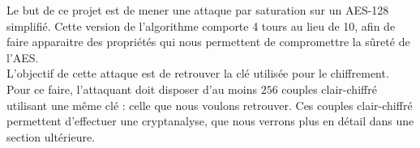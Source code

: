 \indent Le but de ce projet est de mener une attaque par saturation sur un AES-128 simplifié. Cette version de l'algorithme comporte 4 tours au lieu de 10, afin de faire apparaitre des propriétés qui nous permettent de compromettre la sûreté de l'AES. \\
\indent L'objectif de cette attaque est de retrouver la clé utilisée pour le chiffrement. Pour ce faire, l'attaquant doit disposer d'au moins $256$ couples clair-chiffré utilisant une même clé : celle que nous voulons retrouver. Ces couples clair-chiffré permettent d'effectuer une cryptanalyse, que nous verrons plus en détail dans une section ultérieure.


